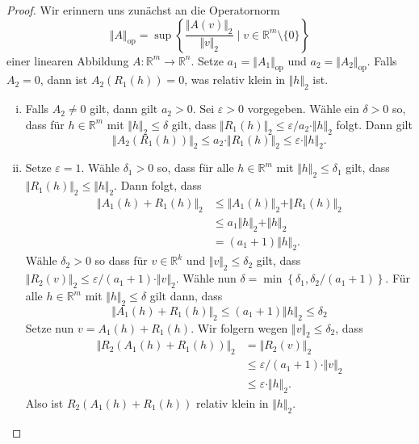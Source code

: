 \documentclass[../main.tex]{subfiles}
\begin{document}
\begin{proof}
  Wir erinnern uns zunächst an die Operatornorm
  \[
    \Vert A \Vert_{\text{op}} =
    \sup \left\{\frac{\Vert A(v) \Vert_2}{\Vert v \Vert_2}
    \mid v \in \mathbb{R}^m \setminus \{0\} \right\}
  \]
  einer linearen Abbildung $A \colon \mathbb{R}^m \to \mathbb{R}^n$.
  Setze $a_1 = \Vert A_1 \Vert_{\text{op}}$ und 
  $a_2 = \Vert A_2 \Vert_{\text{op}}$.
  Falls $A_2 = 0$, dann ist $A_2(R_1(h)) = 0$, was
  relativ klein in $\Vert h \Vert_2$ ist.
  \begin{enumerate}[(i)]
    \item 
      Falls $A_2 \neq 0$ gilt, dann gilt $a_2 > 0$.
      Sei $\varepsilon > 0$ vorgegeben. Wähle ein
      $\delta > 0$ so, dass
      für $h \in \mathbb{R}^m$ mit $\Vert h \Vert_2 \leq \delta$ gilt,
      dass $\Vert R_1(h)\Vert_2 \leq \varepsilon / a_2
      \cdot \Vert h \Vert_2$ folgt.
      Dann gilt
      \[
        \Vert A_2(R_1(h)) \Vert_2 \leq a_2 \cdot \Vert R_1(h) \Vert_2
        \leq \varepsilon \cdot \Vert h \Vert_2.
      \]
    \item 
      Setze $\varepsilon = 1$.%
      Wähle $\delta_1 > 0$ so, dass für alle
      $h \in \mathbb{R}^m$ mit $\Vert h \Vert_2 \leq \delta_1$ 
      gilt, dass $\Vert R_1(h) \Vert_2 \leq \Vert h \Vert_2$.
      Dann folgt, dass
      \begin{align*}
        \Vert A_1(h) + R_1(h) \Vert_2 
        &\leq \Vert A_1(h) \Vert_2 + \Vert R_1(h) \Vert_2  \\
        &\leq a_1 \Vert h \Vert_2 + \Vert h \Vert_2 \\
        &= (a_1 + 1) \Vert h \Vert_2.
      \end{align*}
      Wähle $\delta_2 > 0$ so dass für
      $v \in \mathbb{R}^k$ 
      und $\Vert v \Vert_2 \leq \delta_2$ gilt,
      dass
      $\Vert R_2(v) \Vert_2 \leq \varepsilon/(a_1 + 1) \cdot \Vert v \Vert_2$.
      Wähle nun $\delta = \min \left\{\delta_1,
      \delta_2 / (a_1 + 1) \right\}$.
      Für alle $h \in \mathbb{R}^m$ mit
      $\Vert h \Vert_2 \leq \delta$ gilt dann, dass
      \[
        \Vert A_1(h) + R_1(h) \Vert_2
         \leq (a_1 + 1) \Vert h \Vert_2 \leq \delta_2
      \]
      Setze nun $v = A_1(h) + R_1(h)$.
      Wir folgern wegen $\Vert v \Vert_2 \leq \delta_2$, dass
      \begin{align*}
        \Vert R_2(A_1(h) + R_1(h)) \Vert_2 
        & = \Vert R_2(v) \Vert_2  \\
        &\leq \varepsilon / (a_1 + 1) \cdot \Vert v \Vert_2 \\
        &\leq \varepsilon \cdot \Vert h \Vert_2.
      \end{align*}
      Also ist $R_2(A_1(h) + R_1(h))$ relativ klein
      in $\Vert h \Vert_2$. \qedhere
  \end{enumerate}
\end{proof}
\end{document}
